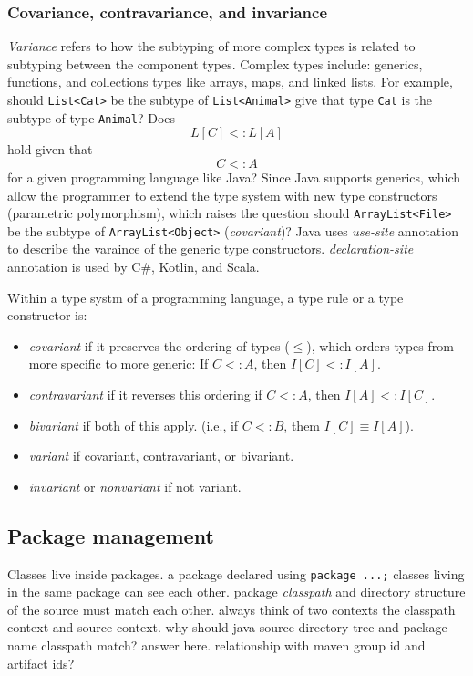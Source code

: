 \documentclass[a4paper]{article}
\begin{document}
\subsubsection*{Covariance, contravariance, and invariance}
\emph{Variance} refers to how the subtyping of more complex types is related to subtyping between the component types.
Complex types include: generics, functions, and collections types like arrays, maps, and linked lists. For example, 
should \lstinline{List<Cat>} be the subtype of \lstinline{List<Animal>} give that type \lstinline{Cat} is the subtype of type \lstinline{Animal}? Does
\[L[C] <: L[A]\] hold given that \[C <: A\] for a given programming language like Java? Since Java supports generics, which
allow the programmer to extend the type system with new type constructors (parametric polymorphism), which raises the question
should \lstinline{ArrayList<File>} be the subtype of \lstinline{ArrayList<Object>} (\emph{covariant})? Java uses 
\emph{use-site}  annotation to describe the varaince of the generic type constructors. \emph{declaration-site} annotation is
used by C\#, Kotlin, and Scala. 

Within a type systm of a programming language, a type rule or a type constructor is:

\begin{itemize}
    \item \emph{covariant} if it preserves the ordering of types (\(\leq\)), which orders types from more specific to more
          generic: If \(C <: A\), then \(I[C] <: I[A]\).
    \item \emph{contravariant} if it reverses this ordering if \(C <: A\), then \(I[A] <: I[C]\).
    \item \emph{bivariant} if both of this apply. (i.e., if \(C <: B\), them \(I[C] \equiv I[A]\)).
    \item \emph{variant} if covariant, contravariant, or bivariant.
    \item \emph{invariant} or \emph{nonvariant} if not variant.
\end{itemize}

\subsection*{Package management}
Classes live inside packages. a package declared using \lstinline{package ...;} classes living in the same 
package can see each other. package \emph{classpath} and directory structure of the source must match each other. 
always think of two contexts the classpath context and source context. why should java source directory tree and
package name classpath match? answer here. relationship with maven group id and artifact ids?
\end{document}
